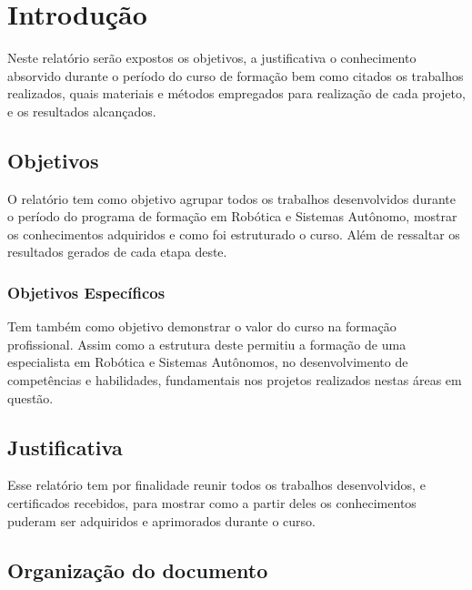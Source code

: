 \chapter{Introdução}
\label{chap:intro}

Neste relatório serão expostos os objetivos, a justificativa  o conhecimento absorvido durante o período do curso de formação bem como citados os trabalhos realizados, quais materiais e métodos empregados para realização de cada projeto, e os resultados alcançados.

\section{Objetivos}
\label{sec:obj}

O relatório tem como objetivo agrupar todos os trabalhos desenvolvidos durante o período do programa de formação em Robótica e Sistemas Autônomo, mostrar os conhecimentos adquiridos e como foi estruturado o curso.
Além de ressaltar os resultados gerados de cada etapa deste.


\subsection{Objetivos Específicos}
\label{ssec:objesp}

Tem também como objetivo demonstrar o valor do curso na formação profissional. Assim como a estrutura deste permitiu a formação de uma especialista em Robótica e Sistemas Autônomos, no desenvolvimento de competências e habilidades, fundamentais nos projetos realizados nestas áreas em questão. 



\section{Justificativa}
\label{sec:justi}

Esse relatório tem por finalidade reunir todos os trabalhos desenvolvidos, e certificados recebidos, para mostrar como a partir deles os conhecimentos puderam ser adquiridos e aprimorados durante o curso. 





\section{Organização do documento}
\label{section:organizacao}

